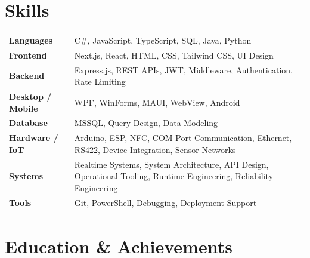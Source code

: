 \documentclass[a4paper,10pt]{article}
\begin{document}
\section*{Skills}

\begin{tabularx}{\textwidth}{@{}>{\raggedright\arraybackslash}p{}X@{}}
\textbf{Languages} & C\#, JavaScript, TypeScript, SQL, Java, Python \\
\textbf{Frontend} & Next.js, React, HTML, CSS, Tailwind CSS, UI Design \\
\textbf{Backend} & Express.js, REST APIs, JWT, Middleware, Authentication, Rate Limiting \\
\textbf{Desktop / Mobile} & WPF, WinForms, MAUI, WebView, Android \\
\textbf{Database} & MSSQL, Query Design, Data Modeling \\
\textbf{Hardware / IoT} & Arduino, ESP, NFC, COM Port Communication, Ethernet, RS422, Device Integration, Sensor Networks \\
\textbf{Systems} & Realtime Systems, System Architecture, API Design, Operational Tooling, Runtime Engineering, Reliability Engineering \\
\textbf{Tools} & Git, PowerShell, Debugging, Deployment Support \\
\end{tabularx}

\section*{Education \& Achievements}
\end{document}
